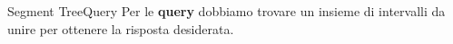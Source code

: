 \documentclass[compress]{beamer}
\begin{document}
\begin{frame}
\end{frame}

\begin{frame}
\end{frame}

\begin{frame}{Segment Tree}{Query}
    Per le \textbf{query} dobbiamo trovare un insieme di intervalli da unire per ottenere la risposta desiderata.\\
    \vfill
\end{frame}
\end{document}
